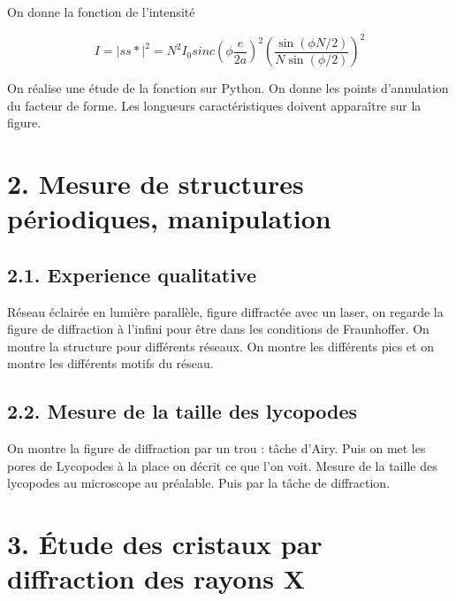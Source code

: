 \documentclass[french, a4paper, 10pt, twocolumn, landscape]{article}
\begin{document}
On donne la fonction de l'intensité 

\begin{equation}
    I = |ss*|^2 = N^2I_0 sinc(\phi \dfrac{e}{2a})^2\left(\dfrac{\sin(\phi N/2)}{N\sin(\phi/2)}\right)^2 
\end{equation}

On réalise une étude de la fonction sur Python. On donne les points d'annulation du facteur de forme. Les longueurs caractéristiques doivent apparaître sur la figure.

\section*{2. Mesure de structures périodiques, manipulation}

\subsection*{2.1. Experience qualitative}

Réseau éclairée en lumière parallèle, figure diffractée avec un laser, on regarde la figure de diffraction à l'infini pour être dans les conditions de Fraunhoffer.
On montre la structure pour différents réseaux. On montre les différents pics et on montre les différents motifs du réseau.

\subsection*{2.2. Mesure de la taille des lycopodes}

On montre la figure de diffraction par un trou : tâche d'Airy. Puis on met les pores de Lycopodes à la place on décrit ce que l'on voit. Mesure de la taille des lycopodes au microscope au préalable. Puis par la tâche de diffraction.



\section*{3. Étude des cristaux par diffraction des rayons X}
\end{document}
